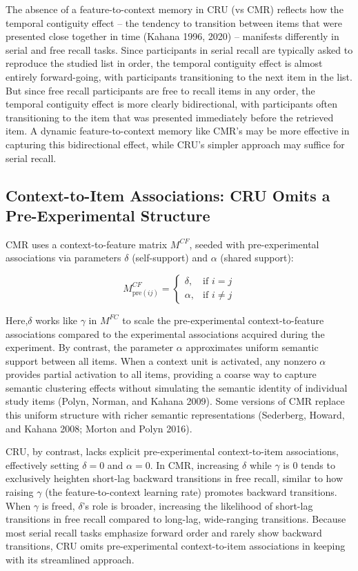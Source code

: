 \documentclass[
  letterpaper,
  11pt,
  english,
  singlespacing,
  headsepline]{MastersDoctoralThesis}
\begin{document}
The absence of a feature-to-context memory in CRU (vs CMR) reflects how
the temporal contiguity effect -- the tendency to transition between
items that were presented close together in time (Kahana 1996, 2020) --
manifests differently in serial and free recall tasks. Since
participants in serial recall are typically asked to reproduce the
studied list in order, the temporal contiguity effect is almost entirely
forward-going, with participants transitioning to the next item in the
list. But since free recall participants are free to recall items in any
order, the temporal contiguity effect is more clearly bidirectional,
with participants often transitioning to the item that was presented
immediately before the retrieved item. A dynamic feature-to-context
memory like CMR's may be more effective in capturing this bidirectional
effect, while CRU's simpler approach may suffice for serial recall.

\subsection{Context-to-Item Associations: CRU Omits a Pre-Experimental
Structure}\label{context-to-item-associations-cru-omits-a-pre-experimental-structure}

CMR uses a context-to-feature matrix \(M^{CF}\), seeded with
pre-experimental associations via parameters \(\delta\) (self-support)
and \(\alpha\) (shared support):

\[
M^{CF}_{\text{pre}(ij)} =
\begin{cases}
  \delta, & \text{if } i=j \\
  \alpha, & \text{if } i \neq j
\end{cases}
\]

Here,\(\delta\) works like \(\gamma\) in \(M^{FC}\) to scale the
pre-experimental context-to-feature associations compared to the
experimental associations acquired during the experiment. By contrast,
the parameter \(\alpha\) approximates uniform semantic support between
all items. When a context unit is activated, any nonzero \(\alpha\)
provides partial activation to all items, providing a coarse way to
capture semantic clustering effects without simulating the semantic
identity of individual study items (Polyn, Norman, and Kahana 2009).
Some versions of CMR replace this uniform structure with richer semantic
representations (Sederberg, Howard, and Kahana 2008; Morton and Polyn
2016).

CRU, by contrast, lacks explicit pre-experimental context-to-item
associations, effectively setting \(\delta = 0\) and \(\alpha = 0\). In
CMR, increasing \(\delta\) while \(\gamma\) is 0 tends to exclusively
heighten short-lag backward transitions in free recall, similar to how
raising \(\gamma\) (the feature-to-context learning rate) promotes
backward transitions. When \(\gamma\) is freed, \(\delta\)'s role is
broader, increasing the likelihood of short-lag transitions in free
recall compared to long-lag, wide-ranging transitions. Because most
serial recall tasks emphasize forward order and rarely show backward
transitions, CRU omits pre-experimental context-to-item associations in
keeping with its streamlined approach.
\end{document}
